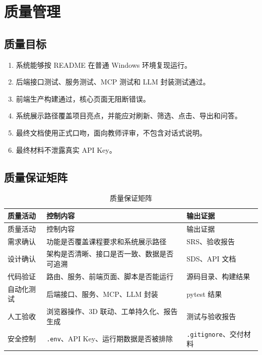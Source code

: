 \documentclass[12pt,a4paper]{ctexart}
\newcommand{\code}[1]{{\footnotesize\nolinkurl{#1}}}
\begin{document}
\section{质量管理}
\subsection{质量目标}
\begin{enumerate}
    \item 系统能够按 README 在普通 Windows 环境复现运行。
    \item 后端接口测试、服务测试、MCP 测试和 LLM 封装测试通过。
    \item 前端生产构建通过，核心页面无阻断错误。
    \item 系统展示路径覆盖项目亮点，并能应对刷新、筛选、点击、导出和问答。
    \item 最终文档使用正式口吻，面向教师评审，不包含对话式说明。
    \item 最终材料不泄露真实 API Key。
\end{enumerate}

\subsection{质量保证矩阵}
\begin{longtable}{p{3.2cm}p{4.8cm}p{5.5cm}}
\caption{质量保证矩阵}\\
\toprule
质量活动 & 控制内容 & 输出证据 \\
\midrule
\endfirsthead
\toprule
质量活动 & 控制内容 & 输出证据 \\
\midrule
\endhead
需求确认 & 功能是否覆盖课程要求和系统展示路径 & SRS、验收报告 \\
设计确认 & 架构是否清晰、接口是否一致、数据是否可追溯 & SDS、API 文档 \\
代码验证 & 路由、服务、前端页面、脚本是否能运行 & 源码目录、构建结果 \\
自动化测试 & 后端接口、服务、MCP、LLM 封装 & pytest 结果 \\
人工验收 & 浏览器操作、3D 联动、工单持久化、报告生成 & 测试与验收报告 \\
安全控制 & \code{.env}、API Key、运行期数据是否被排除 & \code{.gitignore}、交付材料 \\
\bottomrule
\end{longtable}
\end{document}
